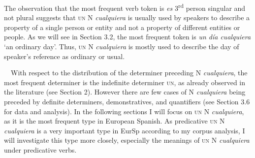 \begin{styleStandard}
The observation that the most frequent verb token is\textit{ es }3\textsuperscript{rd} person singular and not plural suggests that \textsc{un} N \textit{cualquiera }is usually used by speakers to describe a property of a single person or entity and not a property of different entities or people. As we will see in Section 3.2, the most frequent token is \textit{un día cualquiera} ‘an ordinary day’. Thus, \textsc{un} N\textit{ cualquiera} is mostly used to describe the day of speaker’s reference as ordinary or usual. 
\end{styleStandard}

\begin{styleStandard}
\ \ With respect to the distribution of the determiner preceding N \textit{cualquiera}, the most frequent determiner is the indefinite determiner \textsc{un}, as already observed in the literature (see Section 2). However there are few cases of N \textit{cualquiera} being preceded by definite determiners, demonstratives, and quantifiers (see Section 3.6 for data and analysis). In the following sections I will focus on \textsc{un} N \textit{cualquiera}, as it is the most frequent type in European Spanish. As predicative \textsc{un} N \textit{cualquiera} is a very important type in EurSp according to my corpus analysis, I will investigate this type more closely, especially the meanings of \textsc{un} N \textit{cualquiera} under predicative verbs.
\end{styleStandard}

